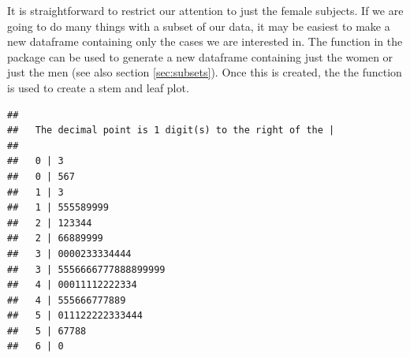 It is straightforward to restrict our attention to just the female subjects.
If we are going to do many things with a subset of our data, it may be easiest
to make a new dataframe containing only the cases we are interested in.
The  function in the  package can be used to generate a new dataframe containing
just the women or just the men  (see also section \ref{sec:subsets}).  Once this is created, the
the  function is used to create a stem and leaf plot.
%
%
%
\begin{knitrout}
\color{fgcolor}\begin{kframe}
\begin{alltt}
 \hlkwb{<-} \hlopt{==}\hlstd{)}
 \hlkwb{<-} \hlopt{==}\hlstd{)}
 
\end{alltt}
\begin{verbatim}
## 
##   The decimal point is 1 digit(s) to the right of the |
## 
##   0 | 3
##   0 | 567
##   1 | 3
##   1 | 555589999
##   2 | 123344
##   2 | 66889999
##   3 | 0000233334444
##   3 | 5556666777888899999
##   4 | 00011112222334
##   4 | 555666777889
##   5 | 011122222333444
##   5 | 67788
##   6 | 0
\end{verbatim}
\end{kframe}
\end{knitrout}

%
%

